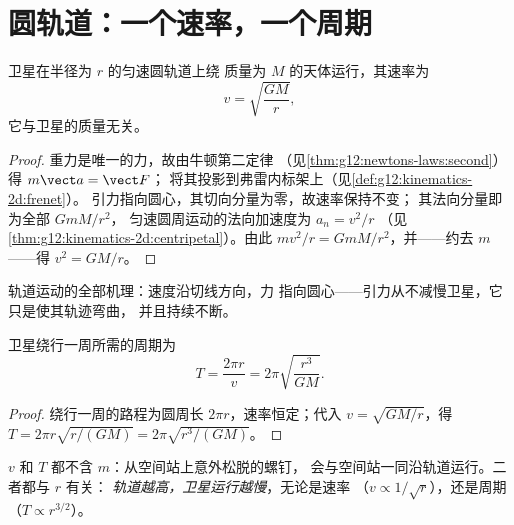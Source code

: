 \section{圆轨道：一个速率，一个周期}

\begin{theorem}[轨道速率]\label{thm:g12:satellites-kepler:speed}
卫星在半径为 $r$ 的匀速圆轨道上绕
质量为 $M$ 的天体运行，其速率为
\[ v = \sqrt{\frac{G M}{r}}, \]
它与卫星的质量无关。
\end{theorem}

\begin{proof}
重力是唯一的力，故由牛顿第二定律
（见\cref{thm:g12:newtons-laws:second}）得 $m\vect a = \vect F$；
将其投影到弗雷内标架上（见\cref{def:g12:kinematics-2d:frenet}）。
引力指向圆心，其切向分量为零，故速率保持不变；
其法向分量即为全部 $GmM/r^2$，
匀速圆周运动的法向加速度为 $a_n = v^2/r$
（见\cref{thm:g12:kinematics-2d:centripetal}）。由此 $m v^2/r =
GmM/r^2$，并——约去 $m$——得 $v^2 = GM/r$。
\end{proof}

\begin{omfigure}

{\small 轨道运动的全部机理：速度沿切线方向，力
指向圆心——引力从不减慢卫星，它只是使其轨迹弯曲，
并且持续不断。}
\end{omfigure}

\begin{proposition}[轨道周期]\label{prop:g12:satellites-kepler:period}
卫星绕行一周所需的周期为
\[ T = \frac{2\pi r}{v} = 2\pi \sqrt{\frac{r^3}{G M}}. \]
\end{proposition}

\begin{proof}
绕行一周的路程为圆周长 $2\pi r$，速率恒定；代入
$v = \sqrt{GM/r}$，得 $T = 2\pi r\sqrt{r/(GM)} = 2\pi\sqrt{r^3/(GM)}$。
\end{proof}

$v$ 和 $T$ 都不含 $m$：从空间站上意外松脱的螺钉，
会与空间站一同沿轨道运行。二者都与 $r$ 有关：
\emph{轨道越高，卫星运行越慢}，无论是速率
（$v \propto 1/\sqrt r$），还是周期（$T \propto r^{3/2}$）。

